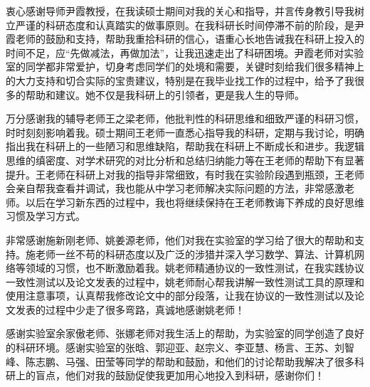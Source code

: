 \begin{acknowledgement}
  衷心感谢导师尹霞教授，在我读硕士期间对我的关心和指导，并言传身教引导我树立严谨的科研态度和认真踏实的做事原则。在我科研长时间停滞不前的阶段，是尹霞老师的鼓励和支持，帮助我重拾科研的信心，语重心长地告诫我在科研上投入的时间不足，应“先做减法，再做加法”，让我迅速走出了科研困境。尹霞老师对实验室的同学都非常爱护，切身考虑同学们的处境和需要，关键时刻给我们很多精神上的大力支持和切合实际的宝贵建议，特别是在我毕业找工作的过程中，给予了我很多的帮助和建议。她不仅是我科研上的引领者，更是我人生的导师。

  万分感谢我的辅导老师王之梁老师，他批判性的科研思维和细致严谨的科研习惯，时时刻刻影响着我。硕士期间王老师一直悉心指导我的科研，定期与我讨论，明确指出我在科研上的一些陋习和思维缺陷，帮助我在科研上不断成长和进步。我逻辑思维的缜密度、对学术研究的对比分析和总结归纳能力等在王老师的帮助下有显著提升。王老师在科研上对我的指导非常细致，有时我在实验阶段遇到瓶颈，王老师会亲自帮我查看并调试，我也能从中学习老师解决实际问题的方法，非常感激老师。以后在学习新东西的过程中，我也将继续保持在王老师教诲下养成的良好思维习惯及学习方式。

  非常感谢施新刚老师、姚姜源老师，他们对我在实验室的学习给了很大的帮助和支持。施老师一丝不苟的科研态度以及广泛的涉猎并深入学习数学、算法、计算机网络等领域的习惯，也不断激励着我。姚老师精通协议的一致性测试，在我实践协议一致性测试以及论文发表的过程中，姚老师耐心帮我讲解一致性测试工具的原理和使用注意事项，认真帮我修改论文中的部分段落，让我在协议的一致性测试以及论文发表的过程中少走了很多弯路，真诚地感谢姚老师！

  感谢实验室余家傲老师、张娜老师对我生活上的帮助，为实验室的同学创造了良好的科研环境。感谢实验室的张晗、郭迎亚、赵宗义、李亚慧、杨言、王苏、刘智峰、陈志鹏、马强、田莹等同学的帮助和鼓励，和他们的讨论帮助我解决了很多科研上的盲点，他们对我的鼓励促使我更加用心地投入到科研，感谢你们！


\end{acknowledgement}
